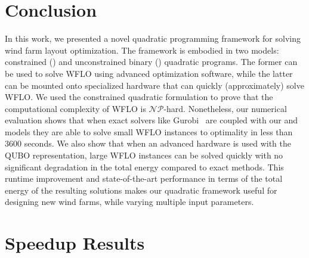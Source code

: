 \documentclass[preprint,12pt]{elsarticle}
\newcommand{\qcls}{{\sf {\small QC-LS\xspace}}}
\newcommand{\quls}{{\sf {\small QU-LS\xspace}}}
\begin{document}

  
\section{Conclusion}
\label{sec:conclusion}

In this work, we presented a novel quadratic programming framework
for solving 
wind farm layout optimization. 
The framework is embodied in two models: constrained (\qcls) and unconstrained binary
 (\quls) quadratic programs. The former can be used to solve WFLO using advanced optimization software,
while the latter can be mounted onto specialized hardware that can quickly (approximately) solve WFLO. We used the constrained quadratic formulation to prove 
that the computational complexity of WFLO is $\mathcal{NP}$-hard. Nonetheless,
our numerical evaluation shows that when exact solvers like Gurobi~\cite{gurobi} are
coupled with our \qcls{} and \quls{} models they are able to solve small WFLO instances to optimality in less than 3600 seconds.
We also show that when an advanced hardware is used with the QUBO representation, large WFLO instances can be solved quickly with no significant degradation in the total energy compared to exact methods.
This runtime improvement and state-of-the-art performance in terms of the total energy of the resulting solutions makes our quadratic framework useful for designing new wind farms, while varying multiple input parameters. 





\appendix

\section{Speedup Results}
\label{app1}
\end{document}

